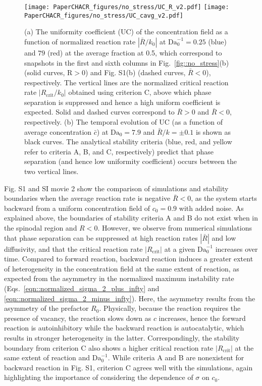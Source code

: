 \documentclass[reprint,aps,pre,superscriptaddress]{revtex4-2}
\begin{document}
\begin{figure*}[htb]
  \texttt{[image: PaperCHACR\_figures/no\_stress/UC\_R\_v2.pdf]}
  \texttt{[image: PaperCHACR\_figures/no\_stress/UC\_cavg\_v2.pdf]}
  \caption{(a) The uniformity coefficient (UC) of the concentration field as a function of normalized reaction rate $|\bar{R}/k_0|$ at $\text{Da}_0^{-1}=0.25$ (blue) and $79$ (red) at the average fraction at 0.5, which correspond to snapshots in the first and sixth columns in Fig.~\ref{fig::no_stress}(b) (solid curves, $\text{R}>0$) and Fig. S1(b) (dashed curves, $\bar{R}<0$), respectively. The vertical lines are the normalized critical reaction rate $|R_\text{crit}/k_0|$ obtained using criterion C, above which phase separation is suppressed and hence a high uniform coefficient is expected. Solid and dashed curves correspond to $\bar{R}>0$ and $\bar{R}<0$, respectively. (b) The temporal evolution of UC (as a function of average concentration $\bar{c}$) at $\text{Da}_0=7.9$ and $\bar{R}/k=\pm 0.1$ is shown as black curves. The analytical stability criteria (blue, red, and yellow refer to criteria A, B, and C, respectively) predict that phase separation (and hence low uniformity coefficient) occurs between the two vertical lines. }
  \label{fig::no_stress_UC}
\end{figure*}

Fig. S1 and SI movie 2 show the comparison of simulations and stability boundaries when the average reaction rate is negative $\bar{R}<0$, as the system starts backward from a uniform concentration field of $c_0=0.9$ with added noise.
As explained above, the boundaries of stability criteria A and B do not exist when in the spinodal region and $R<0$. However, we observe from numerical simulations that phase separation can be suppressed at high reaction rates $|\bar{R}|$ and low diffusivity, and that the critical reaction rate $|R_\text{crit}|$ at a given $\text{Da}_0^{-1}$ increases over time. Compared to forward reaction, backward reaction induces a greater extent of heterogeneity in the concentration field at the same extent of reaction, as expected from the asymmetry in the normalized maximum instability rate (Eqs.~\ref{eqn::normalized_sigma_2_plus_infty} and \ref{eqn::normalized_sigma_2_minus_infty}). Here, the asymmetry results from the asymmetry of the prefactor $R_0$. Physically, because the reaction requires the presence of vacancy, the reaction slows down as $c$ increases, hence the forward reaction is autoinhibitory while the backward reaction is autocatalytic, which results in stronger heterogeneity in the latter.
Correspondingly, the stability boundary from criterion C also shows a higher critical reaction rate $|R_\text{crit}|$ at the same extent of reaction and $\text{Da}_0^{-1}$.
While criteria A and B are nonexistent for backward reaction in Fig. S1, criterion C agrees well with the simulations, again highlighting the importance of considering the dependence of $\sigma$ on $c_0$.
\end{document}
